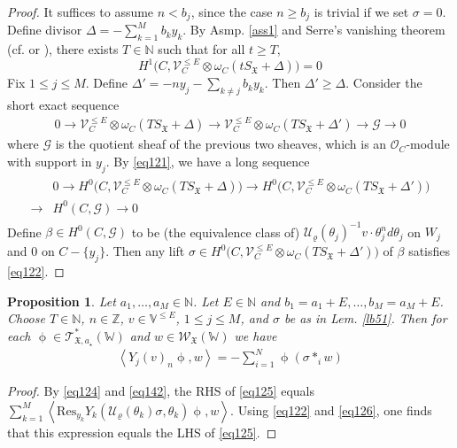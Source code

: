 \documentclass[11pt,b5paper,notitlepage]{article}
\theoremstyle{definition}
\theoremstyle{plain}
\newtheorem{pp}[df]{Proposition}
\newcommand{\fk}{\mathfrak}
\newcommand{\mc}{\mathcal}
\newcommand{\Res}{\mathrm{Res}}
\newcommand{\SV}{\mathscr{V}}
\newcommand{\scr}{\mathscr}
\newcommand{\Vbb}{\mathbb V}
\newcommand{\Wbb}{\mathbb W}
\newcommand{\Nbb}{\mathbb N}
\newcommand{\Zbb}{\mathbb Z}
\newcommand{\<}{\left\langle}
\renewcommand{\>}{\right\rangle}
\newcommand{\fx}{\mathfrak{X}}
\numberwithin{equation}{subsection}
\begin{document}
\begin{proof}
It suffices to assume $n< b_j$, since the case $n\geq b_j$ is trivial if we set $\sigma=0$. Define divisor $\varDelta=-\sum_{k=1}^M b_ky_k$. By Asmp. \ref{ass1} and Serre's vanishing theorem (cf. \cite[Prop. 5.2.7]{Huy} or \cite[Thm. IV.2.1]{BaSt}), there exists $T\in \Nbb$ such that for all $t\geq T$,
    \begin{equation}
    H^1\big(C,\SV_C^{\leq E}\otimes \omega_C(tS_\fx+\varDelta)\big)=0  \label{eq121}
    \end{equation}
Fix $1\leq j\leq M$. Define $\varDelta'=-ny_j-\sum_{k\neq j}b_ky_k$. Then $\varDelta'\geq\varDelta$. Consider the short exact sequence
\begin{align*}
0\rightarrow \SV_C^{\leq E}\otimes \omega_C(TS_\fx+\varDelta)\rightarrow \SV_C^{\leq E}\otimes \omega_C(TS_\fx+\varDelta')\rightarrow\scr G\rightarrow 0
\end{align*} 
where $\scr G$ is the quotient sheaf of the previous two sheaves, which is an $\mc O_C$-module with support in $y_j$. By \eqref{eq121}, we have a long sequence
\begin{align}
\begin{aligned}
&0\rightarrow H^0\big(C,\SV_C^{\leq E}\otimes \omega_C(TS_\fx+\varDelta)\big)\rightarrow H^0\big(C,\SV_C^{\leq E}\otimes \omega_C(TS_\fx+\varDelta')\big)\\
\rightarrow&H^0(C,\scr G)\rightarrow 0
\end{aligned}
\end{align}
Define $\beta\in H^0(C,\scr G)$ to be (the equivalence class of) $\mc U_\varrho(\theta_j)^{-1}v\cdot\theta_j^nd\theta_j$ on $W_j$ and $0$ on $C-\{y_j\}$. Then any lift $\sigma\in H^0\big(C,\SV_C^{\leq E}\otimes \omega_C(TS_\fx+\varDelta')\big)$ of $\beta$ satisfies \eqref{eq122}. 
\end{proof}




\begin{pp}\label{lb52}
Let $a_1,\dots,a_M\in\Nbb$. Let $E\in\Nbb$ and $b_1=a_1+E,\dots,b_M=a_M+E$. Choose $T\in\Nbb$, $n\in\Zbb$, $v\in\Vbb^{\leq E}$, $1\leq j\leq M$, and $\sigma$ be as in Lem. \ref{lb51}. Then for each $\upphi\in\scr T_{\fk X,a_\star}^*(\Wbb)$ and $w\in\scr W_\fx(\Wbb)$ we have
\begin{align}
\<Y_j(v)_n\upphi,w\>=-\sum_{i=1}^N \upphi (\sigma*_i w)  \label{eq125}
\end{align}
\end{pp}


\begin{proof}
By \eqref{eq124} and \eqref{eq142}, the RHS of \eqref{eq125} equals $\sum_{k=1}^M\<\Res_{y_k} Y_k(\mc U_\varrho(\theta_k)\sigma,\theta_k)\upphi,w\>$.
Using \eqref{eq122} and \eqref{eq126}, one finds that this expression equals the LHS of \eqref{eq125}.
\end{proof}
\end{document}
